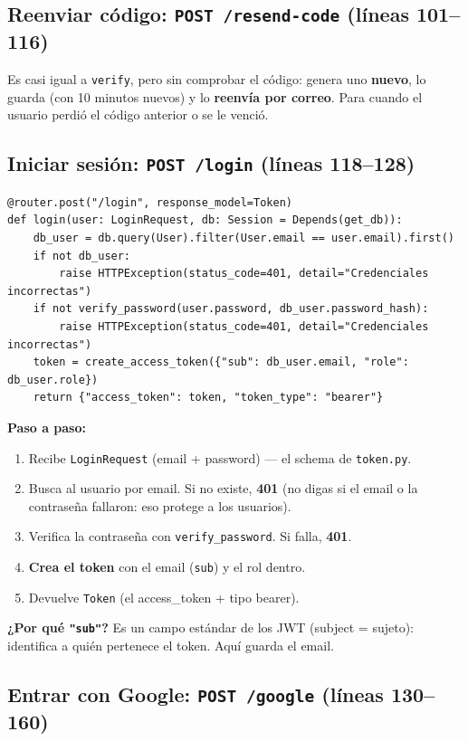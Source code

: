 \documentclass[11pt,a4paper]{article}
\begin{document}
\subsection{Reenviar código: \texttt{POST /resend-code} (líneas 101--116)}

Es casi igual a \texttt{verify}, pero sin comprobar el código: genera uno \textbf{nuevo},
lo guarda (con 10 minutos nuevos) y lo \textbf{reenvía por correo}. Para cuando el usuario
perdió el código anterior o se le venció.

\subsection{Iniciar sesión: \texttt{POST /login} (líneas 118--128)}

\begin{lstlisting}
@router.post("/login", response_model=Token)
def login(user: LoginRequest, db: Session = Depends(get_db)):
    db_user = db.query(User).filter(User.email == user.email).first()
    if not db_user:
        raise HTTPException(status_code=401, detail="Credenciales incorrectas")
    if not verify_password(user.password, db_user.password_hash):
        raise HTTPException(status_code=401, detail="Credenciales incorrectas")
    token = create_access_token({"sub": db_user.email, "role": db_user.role})
    return {"access_token": token, "token_type": "bearer"}
\end{lstlisting}

\textbf{Paso a paso:}
\begin{enumerate}
    \item Recibe \texttt{LoginRequest} (email + password) — el schema de \texttt{token.py}.
    \item Busca al usuario por email. Si no existe, \textbf{401} (no digas si el email o la
    contraseña fallaron: eso protege a los usuarios).
    \item Verifica la contraseña con \texttt{verify\_password}. Si falla, \textbf{401}.
    \item \textbf{Crea el token} con el email (\texttt{sub}) y el rol dentro.
    \item Devuelve \texttt{Token} (el access\_token + tipo bearer).
\end{enumerate}

\textbf{¿Por qué \texttt{"sub"}?} Es un campo estándar de los JWT (subject = sujeto): identifica
a quién pertenece el token. Aquí guarda el email.

\subsection{Entrar con Google: \texttt{POST /google} (líneas 130--160)}
\end{document}
